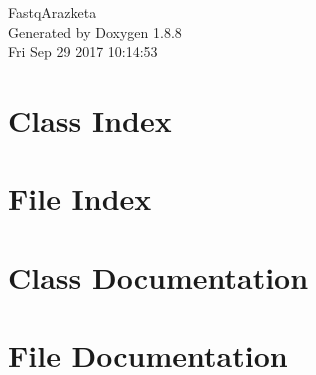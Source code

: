 \documentclass[twoside]{book}
\newcommand{\+}{\discretionary{\mbox{\scriptsize$\hookleftarrow$}}{}{}}
\newcommand{\clearemptydoublepage}{%
  \newpage{\pagestyle{empty}\cleardoublepage}%
}
\begin{document}
\hypersetup{pageanchor=false,
             bookmarks=true,
             bookmarksnumbered=true,
             pdfencoding=unicode
            }
\begin{titlepage}
\vspace*{7cm}
\begin{center}%
{\Large Fastq\+Arazketa }\\
\vspace*{1cm}
{\large Generated by Doxygen 1.8.8}\\
\vspace*{0.5cm}
{\small Fri Sep 29 2017 10:14:53}\\
\end{center}
\end{titlepage}
\clearemptydoublepage
\tableofcontents
\clearemptydoublepage
{}
\hypersetup{pageanchor=true}

\chapter{Class Index}

\chapter{File Index}

\chapter{Class Documentation}



















\chapter{File Documentation}

















































\newpage
{}
{}
\printindex
\end{document}

